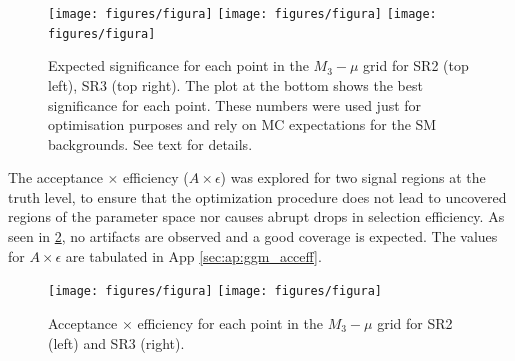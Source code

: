 \begin{figure}[hb!]
  \centering
  \texttt{[image: figures/figura]}
  \texttt{[image: figures/figura]}
  \texttt{[image: figures/figura]}
  \caption{Expected significance for each point in the $M_3-\mu$ grid for SR2 (top left), SR3 (top right).
    The plot at the bottom shows the best significance for each point. These numbers were used just for optimisation purposes and rely on MC expectations for the SM backgrounds. See text for details.}
  \label{fig:opt_exp_significance}
\end{figure}



The acceptance $\times$ efficiency ($A\times\epsilon$) was explored for two signal regions at the truth level,
to ensure that the optimization procedure does not lead to uncovered regions of the parameter space nor causes
abrupt drops in selection efficiency. As seen in {\fig} \ref{fig:efficiency}, no artifacts are observed and a
good coverage is expected. The values for $A\times\epsilon$ are tabulated in App \ref{sec:ap:ggm_acceff}.

\begin{figure}[h!]
  \centering
  \texttt{[image: figures/figura]}
  \texttt{[image: figures/figura]}
  \caption{Acceptance $\times$ efficiency for each point in the $M_3-\mu$ grid for SR2 (left) and SR3 (right).}
  \label{fig:efficiency}
\end{figure}




